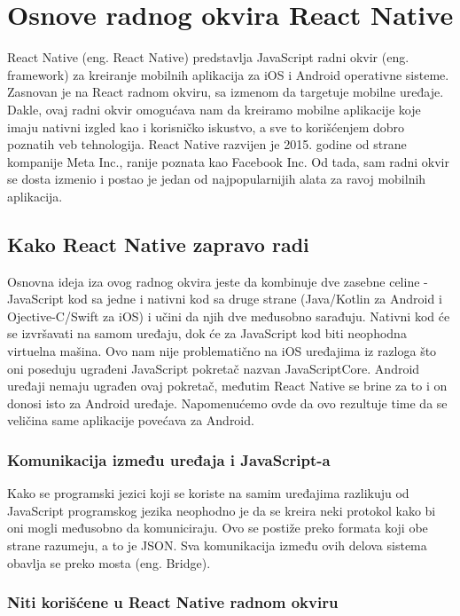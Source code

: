 \documentclass[12pt,oneside]{memoir}
\begin{document}
\chapter{Osnove radnog okvira React Native}

React Native (eng. React Native) predstavlja JavaScript radni okvir (eng. framework) za kreiranje mobilnih aplikacija za iOS i Android operativne sisteme. Zasnovan je na React radnom okviru, sa izmenom da targetuje mobilne uređaje. Dakle, ovaj radni okvir omogućava nam da kreiramo mobilne aplikacije koje imaju nativni izgled kao i korisničko iskustvo, a sve to korišćenjem dobro poznatih veb tehnologija. React Native razvijen je 2015. godine od strane kompanije Meta Inc., ranije poznata kao Facebook Inc. Od tada, sam radni okvir se dosta izmenio i postao je jedan od najpopularnijih alata za ravoj mobilnih aplikacija.

\section{Kako React Native zapravo radi}

Osnovna ideja iza ovog radnog okvira jeste da kombinuje dve zasebne celine - JavaScript kod sa jedne i nativni kod sa druge strane (Java/Kotlin za Android i Ojective-C/Swift za iOS) i učini da njih dve međusobno sarađuju. Nativni kod će se izvršavati na samom uređaju, dok će za JavaScript kod biti neophodna virtuelna mašina. Ovo nam nije problematično na iOS uređajima iz razloga što oni poseduju ugrađeni JavaScript pokretač nazvan JavaScriptCore. Android uređaji nemaju ugrađen ovaj pokretač, međutim React Native se brine za to i on donosi isto za Android uređaje. Napomenućemo ovde da ovo rezultuje time da se veličina same aplikacije povećava za Android.

\subsection{Komunikacija između uređaja i JavaScript-a}

Kako se programski jezici koji se koriste na samim uređajima razlikuju od JavaScript programskog jezika neophodno je da se kreira neki protokol kako bi oni mogli međusobno da komuniciraju. Ovo se postiže preko formata koji obe strane razumeju, a to je JSON. Sva komunikacija između ovih delova sistema obavlja se preko mosta (eng. Bridge).

\subsection{Niti korišćene u React Native radnom okviru}
\end{document}

